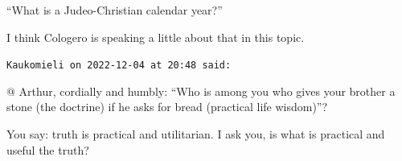 \begin{footnotesize}
\begin{sffamily}
“What is a Judeo-Christian calendar year?”

I think Cologero is speaking a little about that in this topic.

\hfill

\texttt{Kaukomieli on 2022-12-04 at 20:48 said:}

{@}\! Arthur, cordially and humbly: “Who is among you who gives your brother a stone (the doctrine) if he asks for bread (practical life wisdom)”?

You say: truth is practical and utilitarian. I ask you, is what is practical and useful the truth?

\hfill

\end{sffamily}\end{footnotesize}
